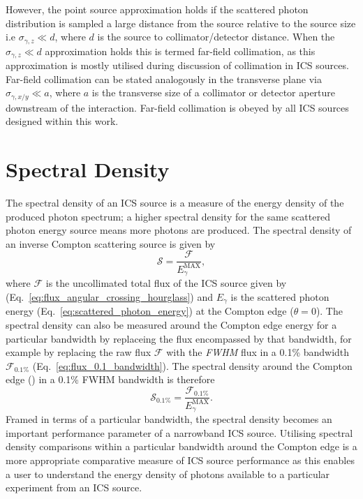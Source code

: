 \documentclass[../main.tex]{subfiles}
\begin{document}
However, the point source approximation holds if the scattered photon distribution is sampled a large distance from the source relative to the source size i.e $\sigma_{\gamma,z} \ll d$, where $d$ is the source to collimator/detector distance. When the $\sigma_{\gamma,z} \ll d$ approximation holds this is termed far-field collimation, as this approximation is mostly utilised during discussion of collimation in ICS sources. Far-field collimation can be stated analogously in the transverse plane via $\sigma_{\gamma,x/y} \ll a$, where $a$ is the transverse size of a collimator or detector aperture downstream of the interaction. Far-field collimation is obeyed by all ICS sources designed within this work.  

\section{Spectral Density}

The spectral density of an ICS source is a measure of the energy density of the produced photon spectrum; a higher spectral density for the same scattered photon energy source means more photons are produced. The spectral density of an inverse Compton scattering source is given by
\begin{equation}
\mathcal{S} = \frac{\mathcal{F}}{E_{\gamma}^{\mathrm{MAX}}},
\label{eq:spectral_density}    
\end{equation}
where $\mathcal{F}$ is the uncollimated total flux of the ICS source given by (Eq.~\ref{eq:flux_angular_crossing_hourglass}) and $E_{\gamma}$ is the scattered photon energy (Eq.~\ref{eq:scattered_photon_energy}) at the Compton edge ($\theta = 0$). The spectral density can also be measured around the Compton edge energy for a particular bandwidth by replaceing the flux encompassed by that bandwidth, for example by replacing the raw flux $\mathcal{F}$ with the \textit{FWHM} flux in a 0.1\% bandwidth $\mathcal{F_{\mathrm{0.1\%}}}$ (Eq.~\ref{eq:flux_0.1_bandwidth}).
The spectral density around the Compton edge () in a 0.1\% FWHM bandwidth is therefore
\begin{equation}
\mathcal{S}_{\mathrm{0.1\%}} = \frac{\mathcal{F_{\mathrm{0.1\%}}}}{E_{\gamma}^{\mathrm{MAX}}}.
\label{eq:spectral_density_0.1}    
\end{equation}
Framed in terms of a particular bandwidth, the spectral density becomes an important performance parameter of a narrowband ICS source. Utilising spectral density comparisons within a particular bandwidth around the Compton edge is a more appropriate comparative measure of ICS source performance as this enables a user to understand the energy density of photons available to a particular experiment from an ICS source.    
\end{document}
